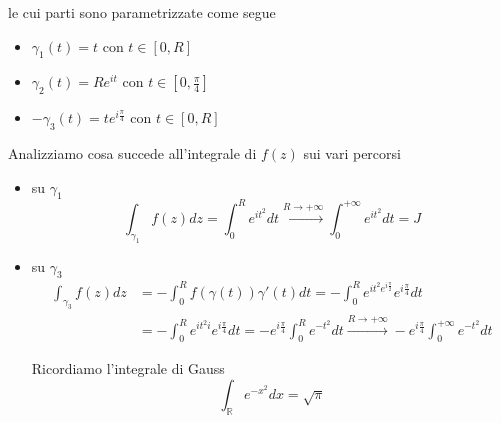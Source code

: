 le cui parti sono parametrizzate come segue
\begin{itemize}
\item $\gamma _{1}\left( t\right) =t$ con $t\in \left[ 0,R\right]$
\item $\gamma _{2}\left( t\right) =Re^{it}$ con $t\in \left[ 0,\frac{\pi }{4}\right]$
\item $-\gamma _{3}\left( t\right) =te^{i\frac{\pi }{4}}$ con $t\in \left[ 0,R\right]$
\end{itemize}

Analizziamo cosa succede all'integrale di $f\left( z\right)$ sui vari percorsi
\begin{itemize}
\item su $\gamma _{1}$\begin{equation*}
\int\nolimits _{\gamma _{1}} f\left( z\right) dz=\int\nolimits ^{R}_{0} e^{it^{2}} dt\xrightarrow{R\rightarrow +\infty }\int\nolimits ^{+\infty }_{0} e^{it^{2}} dt=J
\end{equation*}
\item su $\gamma _{3}$\begin{align*}
\int\nolimits _{\gamma _{3}} f\left( z\right) dz & =-\int\nolimits ^{R}_{0} f\left( \gamma \left( t\right)\right) \gamma '\left( t\right) dt=-\int\nolimits ^{R}_{0} e^{it^{2} e^{i\frac{\pi }{2}}} e^{i\frac{\pi }{4}} dt\\
 & =-\int\nolimits ^{R}_{0} e^{it^{2} i} e^{i\frac{\pi }{4}} dt=-e^{i\frac{\pi }{4}}\int\nolimits ^{R}_{0} e^{-t^{2}} dt\xrightarrow{R\rightarrow +\infty } -e^{i\frac{\pi }{4}}\int\nolimits ^{+\infty }_{0} e^{-t^{2}} dt
\end{align*}

\begin{rem}
Ricordiamo l'integrale di Gauss
\begin{equation*}
\int\nolimits _{\mathbb{R}} e^{-x^{2}} dx=\sqrt{\pi }
\end{equation*}
\end{rem}


\end{itemize}
